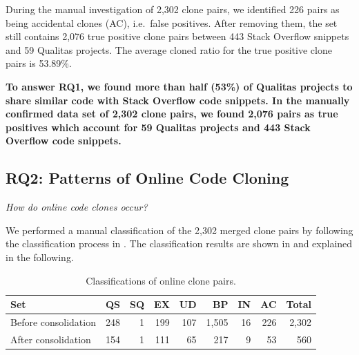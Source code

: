 \documentclass[10pt,journal,compsoc]{IEEEtran}
\begin{document}
During the manual investigation of 2,302 clone pairs, we identified 226 pairs
as being accidental clones (AC), i.e.~false positives. After removing
them, the set still contains 2,076 true positive clone pairs between 443 Stack
Overflow snippets and 59 Qualitas projects. The average cloned ratio for the
true positive clone pairs is 53.89\%.

\textbf{To answer RQ1, we found more than half (53\%) of Qualitas projects to share
	similar code with Stack Overflow code snippets. In the manually confirmed 
	data set of 2,302 clone pairs, we found 2,076 pairs as true positives which 
	account for 59 Qualitas projects and
	443 Stack Overflow code snippets.}

\subsection{RQ2: Patterns of Online Code Cloning}
\vspace{0.25cm}
\textit{How do online code clones occur?}
\vspace{0.25cm}

We performed a manual classification
of the 2,302 merged clone pairs by following the classification process
in . 
The classification results are shown in  
and explained in the following.

\begin{table}
	\centering
	\caption{Classifications of online clone pairs.}
	\label{tab:classification_good_o}
	\begin{tabular}{lrrrrrrrr}
		\toprule
		Set & QS & SQ & EX & UD & BP & IN & AC & Total \\ 
		\midrule
		Before consolidation & 248 & 1 & 199 & 107 & 1,505 & 16 & 226 & 2,302 \\
		After consolidation & 154 & 1 & 111 & 65 & 217 & 9 & 53 & 560 \\
		\bottomrule
	\end{tabular} 
\end{table}
\end{document}
